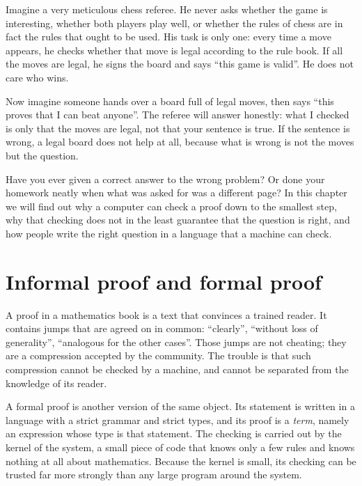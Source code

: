 \begin{untukanak}
Imagine a very meticulous chess referee. He never asks whether the game is interesting, whether
both players play well, or whether the rules of chess are in fact the rules that ought to be used.
His task is only one: every time a move appears, he checks whether that move is legal according to
the rule book. If all the moves are legal, he signs the board and says ``this game is valid''. He
does not care who wins.

Now imagine someone hands over a board full of legal moves, then says ``this proves that I can beat
anyone''. The referee will answer honestly: what I checked is only that the moves are legal, not
that your sentence is true. If the sentence is wrong, a legal board does not help at all, because
what is wrong is not the moves but the question.

Have you ever given a correct answer to the wrong problem? Or done your homework neatly when what
was asked for was a different page? In this chapter we will find out why a computer can check a
proof down to the smallest step, why that checking does not in the least guarantee that the
question is right, and how people write the right question in a language that a machine can check.
\end{untukanak}

\section{Informal proof and formal proof}


A proof in a mathematics book is a text that convinces a trained reader. It contains jumps that are
agreed on in common: ``clearly'', ``without loss of generality'', ``analogous for the other cases''.
Those jumps are not cheating; they are a compression accepted by the community. The trouble is that
such compression cannot be checked by a machine, and cannot be separated from the knowledge of its
reader.

A formal proof is another version of the same object. Its statement is written in a language with a
strict grammar and strict types, and its proof is a \emph{term}, namely an expression whose type is
that statement. The checking is carried out by the kernel of the system, a small piece of code that
knows only a few rules and knows nothing at all about mathematics. Because the kernel is small, its
checking can be trusted far more strongly than any large program around the system.

